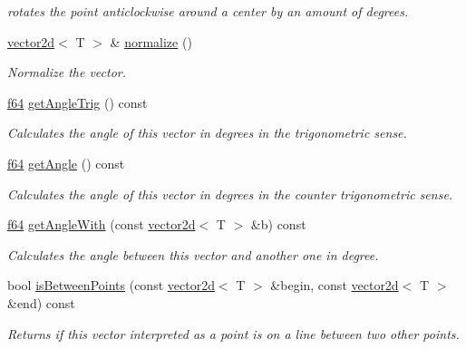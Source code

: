 \begin{DoxyCompactItemize}
\begin{DoxyCompactList}\small\item\em rotates the point anticlockwise around a center by an amount of degrees. \end{DoxyCompactList}\item 
\hyperlink{classirr_1_1core_1_1vector2d}{vector2d}$<$ T $>$ \& \hyperlink{classirr_1_1core_1_1vector2d_a5d5c360ed4c4fd28d4a42272634b8e55}{normalize} ()
\begin{DoxyCompactList}\small\item\em Normalize the vector. \end{DoxyCompactList}\item 
\hyperlink{namespaceirr_a1325b02603ad449f92c68fc640af9b28}{f64} \hyperlink{classirr_1_1core_1_1vector2d_a5aa73f5d0487d651af7dd3ea4a51ea67}{get\+Angle\+Trig} () const
\begin{DoxyCompactList}\small\item\em Calculates the angle of this vector in degrees in the trigonometric sense. \end{DoxyCompactList}\item 
\hyperlink{namespaceirr_a1325b02603ad449f92c68fc640af9b28}{f64} \hyperlink{classirr_1_1core_1_1vector2d_ad41700e8cbebb9899430c576140ee6fd}{get\+Angle} () const
\begin{DoxyCompactList}\small\item\em Calculates the angle of this vector in degrees in the counter trigonometric sense. \end{DoxyCompactList}\item 
\hyperlink{namespaceirr_a1325b02603ad449f92c68fc640af9b28}{f64} \hyperlink{classirr_1_1core_1_1vector2d_a82714b4037cc4985992647ea69974a60}{get\+Angle\+With} (const \hyperlink{classirr_1_1core_1_1vector2d}{vector2d}$<$ T $>$ \&b) const
\begin{DoxyCompactList}\small\item\em Calculates the angle between this vector and another one in degree. \end{DoxyCompactList}\item 
bool \hyperlink{classirr_1_1core_1_1vector2d_aeaf8fc27c46894825b3d84ff47f08a4a}{is\+Between\+Points} (const \hyperlink{classirr_1_1core_1_1vector2d}{vector2d}$<$ T $>$ \&begin, const \hyperlink{classirr_1_1core_1_1vector2d}{vector2d}$<$ T $>$ \&end) const
\begin{DoxyCompactList}\small\item\em Returns if this vector interpreted as a point is on a line between two other points. \end{DoxyCompactList}\item 

\end{DoxyCompactItemize}
